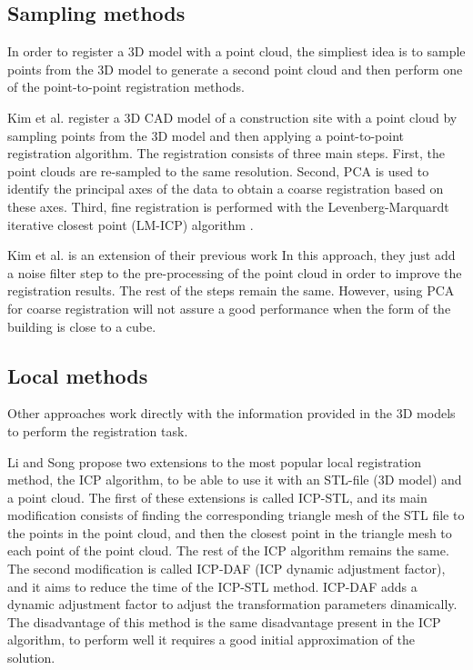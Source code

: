         \subsection{Sampling methods} 

        In order to register a 3D model with a point cloud, the simpliest idea is to sample points from the 3D model to generate a second point cloud
        and then perform one of the point-to-point registration methods. 

        Kim et al. \cite{Kim_2011_fully} register a 3D CAD model of a construction site with a point cloud by sampling points from the 3D model 
        and then applying a point-to-point registration algorithm. The registration consists of three main steps. First, 
        the point clouds are re-sampled to the same resolution. Second, PCA is used to identify the principal axes of the data 
        to obtain a coarse registration based on these axes. Third, fine registration is performed with the Levenberg-Marquardt
        iterative closest point (LM-ICP) algorithm \cite{Fitzgibbon_2003_robust}. 
        
        Kim et al. \cite{Kim_2013_fully} is an extension of their previous work \cite{Kim_2011_fully}
        In this approach, they just add a noise filter step to the pre-processing of the point cloud in order to improve the registration results.
        The rest of the steps remain the same.
        However, using PCA for coarse registration will not assure a good performance when the form of the building is close to a cube.
        
        \subsection{Local methods} 

        Other approaches work directly with the information provided in the 3D models to perform the registration task.

        Li and Song \cite{Li_2015_amodified} propose two extensions to the most popular local registration method, the ICP algorithm, 
        to be able to use it with an STL-file (3D model) and a point cloud.
        The first of these extensions is called ICP-STL, and its main modification consists of finding the corresponding triangle mesh of the STL file to the points 
        in the point cloud, and then the closest point in the triangle mesh to each point of the point cloud. The rest of the ICP algorithm remains the same.
        The second modification is called ICP-DAF (ICP dynamic adjustment factor), and it aims to reduce the time of the ICP-STL method. 
        ICP-DAF adds a dynamic adjustment factor to adjust the transformation parameters dinamically.
        The disadvantage of this method is the same disadvantage present in the ICP algorithm, to perform well it requires a good initial approximation of the solution.


